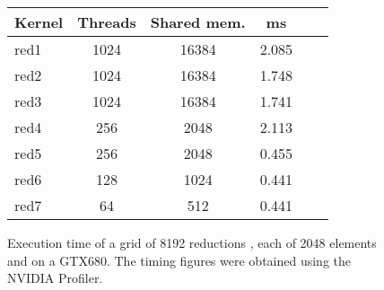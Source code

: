 

\begin{figure} 
\begin{small}
\centering
\begin{tabular}{| l | c | c | c | c | r | }
\hline 
  Kernel & Threads & Shared mem. & ms \\ \hline 
  red1 & 1024 & 16384 & 2.085 \\ \hline
  red2 & 1024 & 16384 & 1.748 \\ \hline
  red3 & 1024 & 16384 & 1.741 \\ \hline
  red4 & 256 & 2048  & 2.113  \\ \hline
  red5 & 256 & 2048  & 0.455  \\ \hline
  red6 & 128 & 1024  & 0.441  \\ \hline
  red7 & 64 & 512    & 0.441  \\ \hline
\end{tabular}
\caption{ Execution time of a grid of 8192 reductions , each of
2048 elements and on a GTX680. The timing figures were obtained using the NVIDIA Profiler.}
\label{fig:reducetable} 
\end{small} 
\end{figure} 

